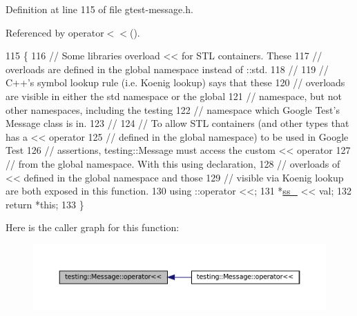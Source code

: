 Definition at line 115 of file gtest-\/message.\+h.



Referenced by operator$<$$<$().


\begin{DoxyCode}
115                                             \{
116     \textcolor{comment}{// Some libraries overload << for STL containers.  These}
117     \textcolor{comment}{// overloads are defined in the global namespace instead of ::std.}
118     \textcolor{comment}{//}
119     \textcolor{comment}{// C++'s symbol lookup rule (i.e. Koenig lookup) says that these}
120     \textcolor{comment}{// overloads are visible in either the std namespace or the global}
121     \textcolor{comment}{// namespace, but not other namespaces, including the testing}
122     \textcolor{comment}{// namespace which Google Test's Message class is in.}
123     \textcolor{comment}{//}
124     \textcolor{comment}{// To allow STL containers (and other types that has a << operator}
125     \textcolor{comment}{// defined in the global namespace) to be used in Google Test}
126     \textcolor{comment}{// assertions, testing::Message must access the custom << operator}
127     \textcolor{comment}{// from the global namespace.  With this using declaration,}
128     \textcolor{comment}{// overloads of << defined in the global namespace and those}
129     \textcolor{comment}{// visible via Koenig lookup are both exposed in this function.}
130     using ::operator <<;
131     *\hyperlink{classtesting_1_1Message_ad46fbddd62cde8526744ae32e3322b76}{ss\_} << val;
132     \textcolor{keywordflow}{return} *\textcolor{keyword}{this};
133   \}
\end{DoxyCode}
Here is the caller graph for this function\+:
\nopagebreak
\begin{figure}[H]
\begin{center}
\leavevmode
\includegraphics[width=350pt]{classtesting_1_1Message_a2e0e71be52d54c20a75a55fca812721f_icgraph}
\end{center}
\end{figure}
\mbox{\label{classtesting_1_1Message_aa3ab685879958f90d2d8cd5b68d10c34}} 
